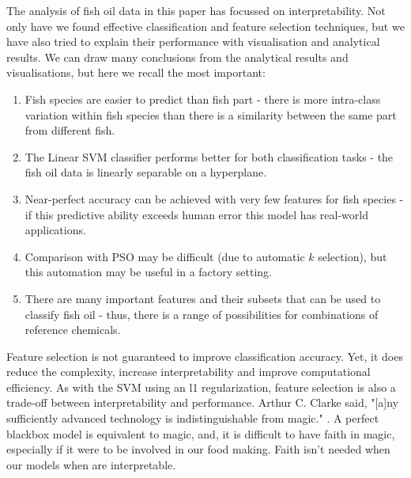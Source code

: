 \documentclass[runningheads]{llncs}
\begin{document}
The analysis of fish oil data in this paper has focussed on interpretability. Not only have we found effective classification and feature selection techniques, but we have also tried to explain their performance with visualisation and analytical results. We can draw many conclusions from the analytical results and visualisations, but here we recall the most important:

\begin{enumerate}
  \item Fish species are easier to predict than fish part - there is more intra-class variation within fish species than there is a similarity between the same part from different fish.
  \item The Linear SVM classifier performs better for both classification tasks - the fish oil data is linearly separable on a hyperplane.
  \item Near-perfect accuracy can be achieved with very few features for fish species - if this predictive ability exceeds human error this model has real-world applications.
  \item Comparison with PSO may be difficult (due to automatic $k$ selection), but this automation may be useful in a factory setting.
  \item There are many important features and their subsets that can be used to classify fish oil - thus, there is a range of possibilities for combinations of reference chemicals.
\end{enumerate}

Feature selection is not guaranteed to improve classification accuracy.
Yet, it does reduce the complexity, increase interpretability and improve computational efficiency.
As with the SVM using an l1 regularization, feature selection is also a trade-off between interpretability and performance.
Arthur C. Clarke said, "[a]ny sufficiently advanced technology is indistinguishable from magic." \cite{clarke2013profiles}.
A perfect blackbox model is equivalent to magic, and, it is difficult to have faith in magic, especially if it were to be involved in our food making.
Faith isn't needed when our models when are interpretable.



\end{document}
